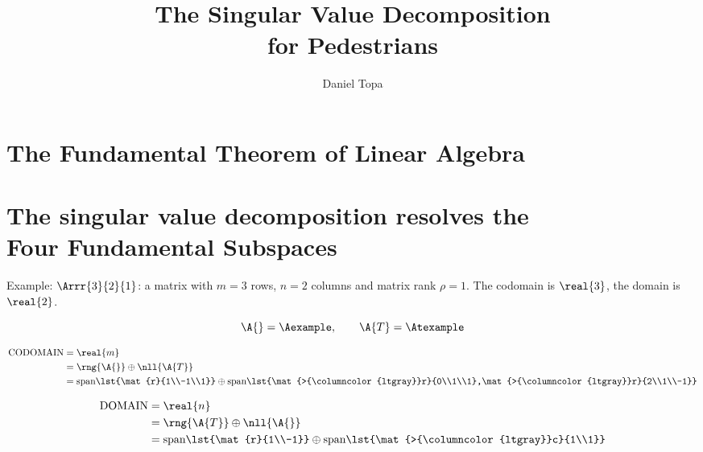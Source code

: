 \documentclass[10pt]{newsiambook}
\begin{document}
\frontmatter

\title{The Singular Value Decomposition\\for Pedestrians}

\author{Daniel Topa}

\maketitle

\section*{The Fundamental Theorem of Linear Algebra}

\clearpage
\break

\section*{The singular value decomposition resolves the \\Four Fundamental Subspaces}
Example: $\Arrr{3}{2}{1}$: a matrix with $m=3$ rows, $n=2$ columns and matrix rank $\rho=1$. The codomain is $\real{3}$, the domain is $\real{2}$.

\begin{equation*}
  \A{} = \Aexample, \qquad \A{T} = \Atexample
\end{equation*}

\begin{equation*}
  \begin{split}
    \text{CODOMAIN} &=\real{m} \\
      &= \rng{\A{}} \oplus \nll{\A{T}}\\
      &= \text{span}\lst{\mat{r}{1\\-1\\1}} \oplus \text{span}\lst{\mat{>{\columncolor{ltgray}}r}{0\\1\\1},\mat{>{\columncolor{ltgray}}r}{2\\1\\-1}}\\
  \end{split}
\end{equation*}

\begin{equation*}
  \begin{split}
    \text{DOMAIN} &=\real{n} \\
      &= \rng{\A{T}} \oplus \nll{\A{}}\\
      &= \text{span}\lst{\mat{r}{1\\-1}} \oplus \text{span}\lst{\mat{>{\columncolor{ltgray}}c}{1\\1}}\\
  \end{split}
\end{equation*}
\end{document}
